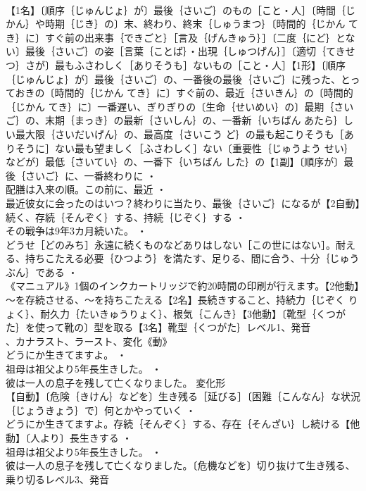 \documentclass[8pt]{extreport}
\begin{document}
\begin{CJK}{UTF8}{min}
\\	【1名】〔順序｛じゅんじょ｝が〕最後｛さいご｝のもの［こと・人］〔時間｛じかん｝や時期｛じき｝の〕末、終わり、終末｛しゅうまつ｝〔時間的｛じかん てき｝に〕すぐ前の出来事｛できごと｝［言及｛げんきゅう｝］〔二度｛にど｝とない〕最後｛さいご｝の姿［言葉｛ことば｝・出現｛しゅつげん｝］〔適切｛てきせつ｝さが〕最もふさわしく［ありそうも］ないもの［こと・人］【1形】〔順序｛じゅんじょ｝が〕最後｛さいご｝の、一番後の最後｛さいご｝に残った、とっておきの〔時間的｛じかん てき｝に〕すぐ前の、最近｛さいきん｝の〔時間的｛じかん てき｝に〕一番遅い、ぎりぎりの〔生命｛せいめい｝の〕最期｛さいご｝の、末期｛まっき｝の最新｛さいしん｝の、一番新｛いちばん あたら｝しい最大限｛さいだいげん｝の、最高度｛さいこう ど｝の最も起こりそうも［ありそうに］ない最も望ましく［ふさわしく］ない〔重要性｛じゅうよう せい｝などが〕最低｛さいてい｝の、一番下｛いちばん した｝の【1副】〔順序が〕最後｛さいご｝に、一番終わりに ・
\\	配膳は入来の順。この前に、最近 ・
\\	最近彼女に会ったのはいつ？終わりに当たり、最後｛さいご｝になるが【2自動】続く、存続｛そんぞく｝する、持続｛じぞく｝する ・
\\	その戦争は9年3カ月続いた。 ・
\\	どうせ［どのみち］永遠に続くものなどありはしない［この世にはない］。耐える、持ちこたえる必要｛ひつよう｝を満たす、足りる、間に合う、十分｛じゅうぶん｝である ・
\\	《マニュアル》1個のインクカートリッジで約20時間の印刷が行えます。【2他動】～を存続させる、～を持ちこたえる【2名】長続きすること、持続力｛じぞく りょく｝、耐久力｛たいきゅうりょく｝、根気｛こんき｝【3他動】〔靴型｛くつがた｝を使って靴の〕型を取る【3名】靴型｛くつがた｝レベル1、発音
\\	、カナラスト、ラースト、変化《動》
\\	どうにか生きてますよ。 ・
\\	祖母は祖父より5年長生きした。 ・
\\	彼は一人の息子を残して亡くなりました。	変化形 
\\	【自動】〔危険｛きけん｝などを〕生き残る［延びる］〔困難｛こんなん｝な状況｛じょうきょう｝で〕何とかやっていく ・
\\	どうにか生きてますよ。存続｛そんぞく｝する、存在｛そんざい｝し続ける【他動】〔人より〕長生きする ・
\\	祖母は祖父より5年長生きした。 ・
\\	彼は一人の息子を残して亡くなりました。〔危機などを〕切り抜けて生き残る、乗り切るレベル3、発音

\end{CJK}
\end{document}
